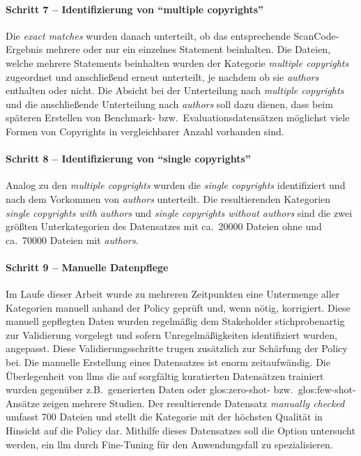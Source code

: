 \paragraph{Schritt 7 -- Identifizierung von \enquote{multiple copyrights}}
Die \textit{exact matches} wurden danach unterteilt, ob das entsprechende ScanCode-Ergebnis mehrere oder nur ein einzelnes Statement beinhalten.
Die Dateien, welche mehrere Statements beinhalten wurden der Kategorie \textit{multiple copyrights} zugeordnet und anschließend erneut unterteilt, je nachdem ob sie \textit{authors} enthalten oder nicht.
Die Absicht bei der Unterteilung nach \textit{multiple copyrights} und die anschließende Unterteilung nach \textit{authors} soll dazu dienen, dass beim späteren Erstellen von Benchmark- bzw.\ Evaluationsdatensätzen möglichst viele Formen von Copyrights in vergleichbarer Anzahl vorhanden sind.

\paragraph{Schritt 8 -- Identifizierung von \enquote{single copyrights}}
Analog zu den \textit{multiple copyrights} wurden die \textit{single copyrights} identifiziert und nach dem Vorkommen von \textit{authors} unterteilt.
Die resultierenden Kategorien \textit{single copyrights with authors} und \textit{single copyrights without authors} sind die zwei größten Unterkategorien des Datensatzes mit ca.\ \num{20000} Dateien ohne und ca.\ \num{70000} Dateien mit \textit{authors}.

\paragraph{Schritt 9 -- Manuelle Datenpflege}
Im Laufe dieser Arbeit wurde zu mehreren Zeitpunkten eine Untermenge aller Kategorien manuell anhand der Policy geprüft und, wenn nötig, korrigiert.
Diese manuell gepflegten Daten wurden regelmäßig dem Stakeholder stichprobenartig zur Validierung vorgelegt und sofern Unregelmäßigkeiten identifiziert wurden, angepasst.
Diese Validierungsschritte trugen zusätzlich zur Schärfung der Policy bei.
Die manuelle Erstellung eines Datensatzes ist enorm zeitaufwändig.
Die Überlegenheit von \glspl{llm} die auf sorgfältig kuratierten Datensätzen trainiert wurden gegenüber z.B.\ generierten Daten oder \gls{glos:zero-shot}- bzw.\ \gls{glos:few-shot}-Ansätze zeigen mehrere Studien\autocite{breton_empowering_2024}\autocite{villena_llmner_2024}.
Der resultierende Datensatz \textit{manually checked} umfasst \num{700} Dateien und stellt die Kategorie mit der höchsten Qualität in Hinsicht auf die Policy dar.
Mithilfe dieses Datensatzes soll die Option untersucht werden, ein \gls{llm} durch Fine-Tuning für den Anwendungsfall zu spezialisieren.

